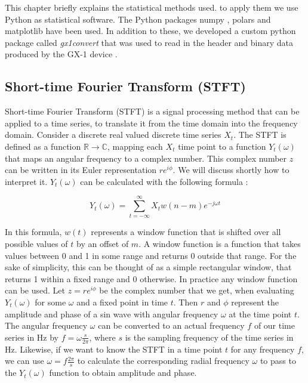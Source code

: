 \documentclass[12 pt]{scrartcl}
\begin{document}
This chapter briefly explains the statistical methods used. to apply them we use Python \citep{python} as statistical software. The Python packages numpy \citep{numpy}, polars \citep{polars} and matplotlib \citep{matplotlib} have been used. In addition to these, we developed a custom python package called \emph{gx1convert} \citep{gx1convert} that was used to read in the header and binary data produced by the GX-1 device \citep{gx1convert}.

\subsection{Short-time Fourier Transform (STFT)}

Short-time Fourier Transform (STFT) is a signal processing method that can be applied to a time series, to translate it from the time domain into the frequency domain. Consider a discrete real valued discrete time series $X_t$. The STFT is defined as a function $\mathbb{R} \rightarrow \mathbb{C}$, mapping each $X_t$ time point to a function $Y_t(\omega)$ that maps an angular frequency to a complex number. This complex number $z$ can be written in its Euler representation $r e^{i \phi}$. We will discuss shortly how to interpret it. $Y_t(\omega)$ can be calculated with the following formula \citep{SASPWEB2011}:

\[ Y_t(\omega) = \sum_{t=-\infty}^{\infty}{X_t w(n-m) e^{-j \omega t}}  \]

In this formula, $w(t)$ represents a window function that is shifted over all possible values of $t$ by an offset of $m$. A window function is a function that takes values between 0 and 1 in some range and returns 0 outside that range. For the sake of simplicity, this can be thought of as a simple rectangular window, that returns 1 within a fixed range and 0 otherwise. In practice any window function can be used. Let $z = r e^{i \phi}$ be the complex number that we get, when evaluating $Y_t(\omega)$ for some $\omega$ and a fixed point in time $t$. Then $r$ and $\phi$ represent the amplitude and phase of a sin wave with angular frequency $\omega$ at the time point $t$. The angular frequency $\omega$ can be converted to an actual frequency $f$ of our time series in Hz by $f = \omega \frac{s}{2 \pi}$, where $s$ is the sampling frequency of the time series in Hz. Likewise, if we want to know the STFT in a time point $t$ for any frequency $f$, we can use $\omega = f \frac{2 \pi}{s}$ to calculate the corresponding radial frequency $\omega$ to pass to the $Y_t(\omega)$ function to obtain amplitude and phase.
\end{document}
